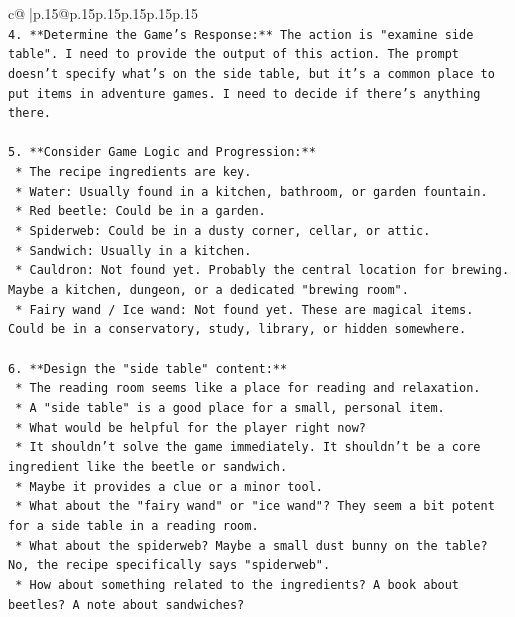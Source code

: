 \documentclass{article}
\begin{document}
{\begin{supertabular}{c@{$\;$}|p{.15\linewidth}@{}p{.15\linewidth}p{.15\linewidth}p{.15\linewidth}p{.15\linewidth}p{.15\linewidth}}
{{{\\ 
\texttt{4.  **Determine the Game's Response:** The action is "examine side table". I need to provide the output of this action. The prompt doesn't specify what's on the side table, but it's a common place to put items in adventure games. I need to decide if there's anything there.} \\
\\ 
\texttt{5.  **Consider Game Logic and Progression:**} \\
\texttt{    *   The recipe ingredients are key.} \\
\texttt{    *   Water: Usually found in a kitchen, bathroom, or garden fountain.} \\
\texttt{    *   Red beetle: Could be in a garden.} \\
\texttt{    *   Spiderweb: Could be in a dusty corner, cellar, or attic.} \\
\texttt{    *   Sandwich: Usually in a kitchen.} \\
\texttt{    *   Cauldron: Not found yet. Probably the central location for brewing. Maybe a kitchen, dungeon, or a dedicated "brewing room".} \\
\texttt{    *   Fairy wand / Ice wand: Not found yet. These are magical items. Could be in a conservatory, study, library, or hidden somewhere.} \\
\\ 
\texttt{6.  **Design the "side table" content:**} \\
\texttt{    *   The reading room seems like a place for reading and relaxation.} \\
\texttt{    *   A "side table" is a good place for a small, personal item.} \\
\texttt{    *   What would be helpful for the player right now?} \\
\texttt{    *   It shouldn't solve the game immediately. It shouldn't be a core ingredient like the beetle or sandwich.} \\
\texttt{    *   Maybe it provides a clue or a minor tool.} \\
\texttt{    *   What about the "fairy wand" or "ice wand"? They seem a bit potent for a side table in a reading room.} \\
\texttt{    *   What about the spiderweb? Maybe a small dust bunny on the table? No, the recipe specifically says "spiderweb".} \\
\texttt{    *   How about something related to the ingredients? A book about beetles? A note about sandwiches?} \\
}}}
\end{supertabular}}
\end{document}
